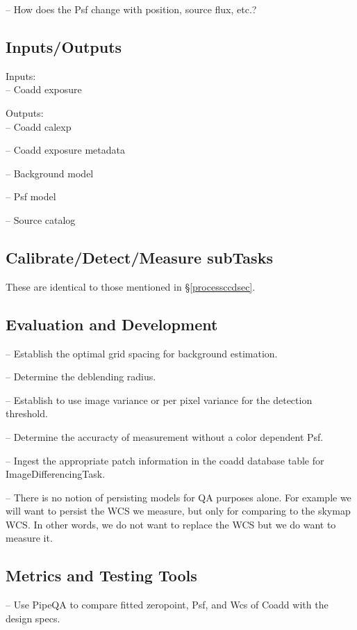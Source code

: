 \documentclass[12pt]{article}
\begin{document}
-- How does the Psf change with position, source flux, etc.?

\subsection{Inputs/Outputs}

Inputs: \\
-- Coadd exposure

Outputs:\\
-- Coadd calexp

-- Coadd exposure metadata

-- Background model

-- Psf model

-- Source catalog

\subsection{Calibrate/Detect/Measure subTasks}
These are identical to those mentioned in \S \ref{processccdsec}.

\subsection{Evaluation and Development}

-- Establish the optimal grid spacing for background estimation.

-- Determine the deblending radius.

-- Establish to use image variance or per pixel variance for the detection threshold.

-- Determine the accuracty of measurement without a color dependent Psf.

-- Ingest the appropriate patch information in the coadd database table for ImageDifferencingTask.

-- There is no notion of persisting models for QA purposes alone.  For example we will want to persist
the WCS we measure, but only for comparing to the skymap WCS.  In other words, we do not want to replace the 
WCS but we do want to measure it.  

\subsection{Metrics and Testing Tools}

-- Use PipeQA to compare fitted zeropoint, Psf, and Wcs of Coadd with the design specs.

\end{document}
